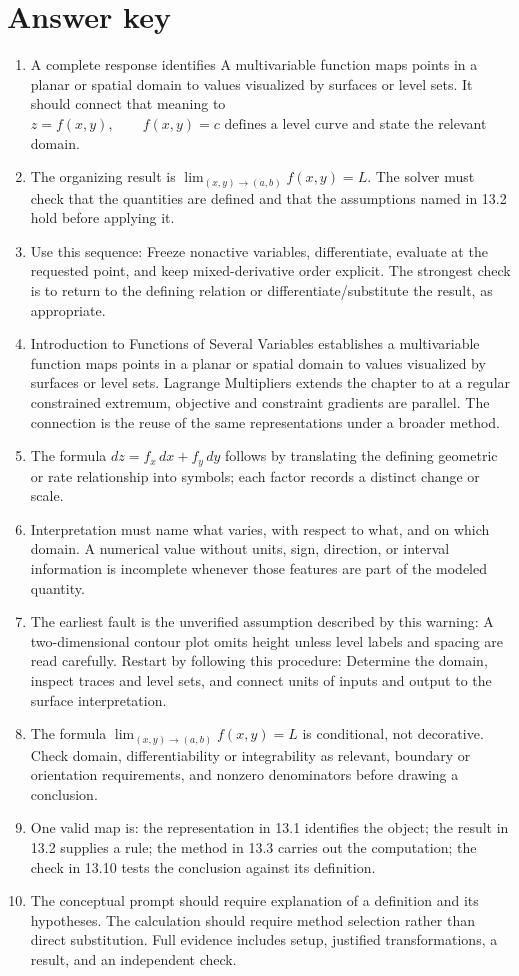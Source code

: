 \documentclass[11pt]{article}
\begin{document}
\section{Answer key}
\small
\begin{enumerate}
\item A complete response identifies A multivariable function maps points in a planar or spatial domain to values visualized by surfaces or level sets. It should connect that meaning to \(z=f(x,y),\qquad f(x,y)=c\text{ defines a level curve}\) and state the relevant domain.
\item The organizing result is \(\lim_{(x,y)\to(a,b)}f(x,y)=L\). The solver must check that the quantities are defined and that the assumptions named in 13.2 hold before applying it.
\item Use this sequence: Freeze nonactive variables, differentiate, evaluate at the requested point, and keep mixed-derivative order explicit. The strongest check is to return to the defining relation or differentiate/substitute the result, as appropriate.
\item Introduction to Functions of Several Variables establishes a multivariable function maps points in a planar or spatial domain to values visualized by surfaces or level sets. Lagrange Multipliers extends the chapter to at a regular constrained extremum, objective and constraint gradients are parallel. The connection is the reuse of the same representations under a broader method.
\item The formula \(dz=f_x\,dx+f_y\,dy\) follows by translating the defining geometric or rate relationship into symbols; each factor records a distinct change or scale.
\item Interpretation must name what varies, with respect to what, and on which domain. A numerical value without units, sign, direction, or interval information is incomplete whenever those features are part of the modeled quantity.
\item The earliest fault is the unverified assumption described by this warning: A two-dimensional contour plot omits height unless level labels and spacing are read carefully. Restart by following this procedure: Determine the domain, inspect traces and level sets, and connect units of inputs and output to the surface interpretation.
\item The formula \(\lim_{(x,y)\to(a,b)}f(x,y)=L\) is conditional, not decorative. Check domain, differentiability or integrability as relevant, boundary or orientation requirements, and nonzero denominators before drawing a conclusion.
\item One valid map is: the representation in 13.1 identifies the object; the result in 13.2 supplies a rule; the method in 13.3 carries out the computation; the check in 13.10 tests the conclusion against its definition.
\item The conceptual prompt should require explanation of a definition and its hypotheses. The calculation should require method selection rather than direct substitution. Full evidence includes setup, justified transformations, a result, and an independent check.
\end{enumerate}
\normalsize
\end{document}
